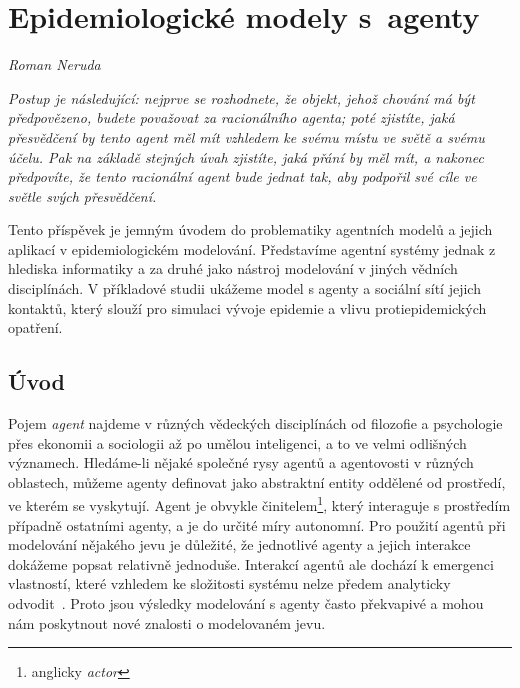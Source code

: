
\chapter{Epidemiologické modely s~agenty}\label{Modely_Agenty}
\label{Agentni_modely}
\textit{Roman Neruda}
\vspace{15mm}


\setlength{\epigraphrule}{0pt}
\setlength{\epigraphwidth}{.6\textwidth}
\epigraph{\textit{\flushepinormal
Postup je následující: nejprve se rozhodnete, že objekt, jehož chování má být předpovězeno, budete považovat za racionálního agenta; poté zjistíte, jaká přesvědčení by tento agent měl mít vzhledem ke svému místu ve světě a svému účelu. Pak na základě stejných úvah zjistíte, jaká přání by měl mít, a nakonec předpovíte, že tento racionální agent bude jednat tak, aby podpořil své cíle ve světle svých přesvědčení.}} 
{\cite{Dennett87}}


Tento příspěvek je jemným úvodem do problematiky agentních modelů a jejich aplikací v epidemiologickém modelování. Představíme agentní systémy jednak z hlediska informatiky a za druhé jako nástroj modelování v jiných vědních disciplínách. V příkladové studii ukážeme model s agenty a sociální sítí jejich kontaktů, který slouží pro simulaci vývoje epidemie a vlivu protiepidemických opatření.

\section*{Úvod} 

Pojem \emph{agent} najdeme v různých vědeckých disciplínách od filozofie a psychologie přes ekonomii a sociologii až po umělou inteligenci, a to ve velmi odlišných významech. Hledáme-li nějaké společné rysy agentů a agentovosti v různých oblastech, můžeme agenty definovat jako abstraktní entity oddělené od prostředí, ve kterém se vyskytují. Agent je obvykle činitelem\footnote{anglicky \emph{actor}}, který interaguje s prostředím případně ostatními agenty, a je do určité míry autonomní. Pro použití agentů při modelování nějakého jevu je důležité, že jednotlivé agenty a jejich interakce dokážeme popsat relativně jednoduše. Interakcí agentů ale dochází k emergenci vlastností, které vzhledem ke složitosti systému nelze předem analyticky odvodit~\cite{Symons18}. Proto jsou výsledky modelování s agenty často překvapivé a mohou nám poskytnout nové znalosti o modelovaném jevu. 

